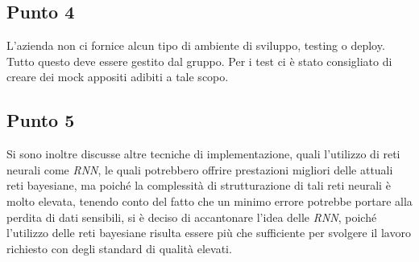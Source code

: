 \subsection{Punto 4}
L'azienda non ci fornice alcun tipo di ambiente di sviluppo, testing o deploy. Tutto questo deve essere 
gestito dal gruppo. Per i test ci è stato consigliato di creare dei mock appositi adibiti a tale scopo. 

\subsection{Punto 5}
Si sono inoltre discusse altre tecniche di implementazione, quali l'utilizzo di reti neurali come \textit{RNN}, 
le quali potrebbero offrire prestazioni migliori delle attuali reti bayesiane, ma poiché la complessità di 
strutturazione di tali reti neurali è molto elevata, tenendo conto del fatto che un minimo errore potrebbe 
portare alla perdita di dati sensibili, si è deciso di accantonare l'idea delle \textit{RNN}, poiché l'utilizzo delle reti 
bayesiane risulta essere più che sufficiente per svolgere il lavoro richiesto con degli standard di qualità elevati. 
